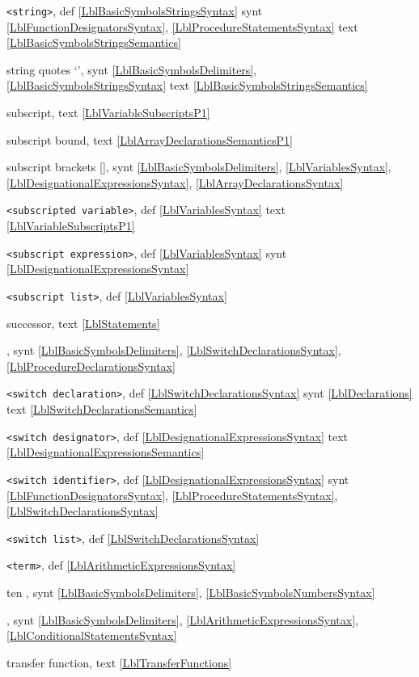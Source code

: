 \documentclass[a4paper,11pt]{article}
\begin{document}
\texttt{<string>},
def
\ref{LblBasicSymbolsStringsSyntax}
synt
\ref{LblFunctionDesignatorsSyntax},
\ref{LblProcedureStatementsSyntax}
text
\ref{LblBasicSymbolsStringsSemantics}\*

string quotes `',
synt
\ref{LblBasicSymbolsDelimiters},
\ref{LblBasicSymbolsStringsSyntax}
text
\ref{LblBasicSymbolsStringsSemantics}\*

subscript,
text
\ref{LblVariableSubscriptsP1}\*

subscript bound,
text
\ref{LblArrayDeclarationsSemanticsP1}\*

subscript brackets [],
synt
\ref{LblBasicSymbolsDelimiters},
\ref{LblVariablesSyntax},
\ref{LblDesignationalExpressionsSyntax},
\ref{LblArrayDeclarationsSyntax}\*

\texttt{<subscripted variable>},
def
\ref{LblVariablesSyntax}
text
\ref{LblVariableSubscriptsP1}\*

\texttt{<subscript expression>},
def
\ref{LblVariablesSyntax}
synt
\ref{LblDesignationalExpressionsSyntax}\*

\texttt{<subscript list>},
def
\ref{LblVariablesSyntax}\*

successor,
text
\ref{LblStatements}\*

,
synt
\ref{LblBasicSymbolsDelimiters},
\ref{LblSwitchDeclarationsSyntax},
\ref{LblProcedureDeclarationsSyntax}\*

\texttt{<switch declaration>},
def
\ref{LblSwitchDeclarationsSyntax}
synt
\ref{LblDeclarations}
text
\ref{LblSwitchDeclarationsSemantics}\*

\texttt{<switch designator>},
def
\ref{LblDesignationalExpressionsSyntax}
text
\ref{LblDesignationalExpressionsSemantics}\*

\texttt{<switch identifier>},
def
\ref{LblDesignationalExpressionsSyntax}
synt
\ref{LblFunctionDesignatorsSyntax},
\ref{LblProcedureStatementsSyntax},
\ref{LblSwitchDeclarationsSyntax}\*

\texttt{<switch list>},
def
\ref{LblSwitchDeclarationsSyntax}\*

\texttt{<term>},
def
\ref{LblArithmeticExpressionsSyntax}\*

ten \ten{},
synt
\ref{LblBasicSymbolsDelimiters},
\ref{LblBasicSymbolsNumbersSyntax}\*

,
synt
\ref{LblBasicSymbolsDelimiters},
\ref{LblArithmeticExpressionsSyntax},
\ref{LblConditionalStatementsSyntax}\*

transfer function,
text
\ref{LblTransferFunctions}\*
\end{document}
